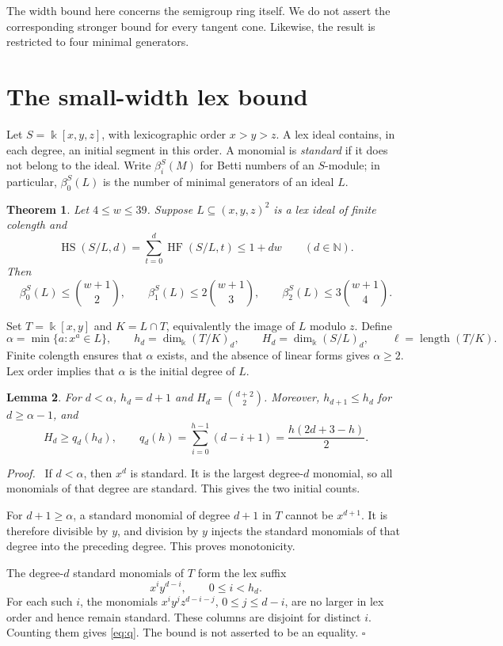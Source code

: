 \documentclass[11pt,a4paper]{article}
\newtheorem{theorem}{Theorem}[section]
\newtheorem{lemma}[theorem]{Lemma}
\newenvironment{proof}[1][Proof]{\par\noindent\textit{#1.}\ \ignorespaces}{\unskip\nobreak\hfill\ensuremath{\square}\par}
\newcommand{\NN}{\mathbb N}
\newcommand{\kk}{\Bbbk}
\newcommand{\HF}{\operatorname{HF}}
\newcommand{\HS}{\operatorname{HS}}
\newcommand{\len}{\operatorname{length}}
\begin{document}
The width bound here concerns the semigroup ring itself. We do not assert the corresponding stronger bound for every tangent cone. Likewise, the result is restricted to four minimal generators.

\section{The small-width lex bound}\label{sec:lex}
Let $S=\kk[x,y,z]$, with lexicographic order $x>y>z$. A lex ideal contains, in each degree, an initial segment in this order. A monomial is \emph{standard} if it does not belong to the ideal. Write $\beta_i^S(M)$ for Betti numbers of an $S$-module; in particular, $\beta_0^S(L)$ is the number of minimal generators of an ideal $L$.

\begin{theorem}\label{thm:lex}
Let $4\le w\le39$. Suppose $L\subseteq(x,y,z)^2$ is a lex ideal of finite colength and
\begin{equation}\label{eq:budget}
 \HS(S/L,d)=\sum_{t=0}^{d}\HF(S/L,t)\le1+dw\qquad(d\in\NN).
\end{equation}
Then
\[
 \beta_0^S(L)\le\binom{w+1}{2},\qquad
 \beta_1^S(L)\le2\binom{w+1}{3},\qquad
 \beta_2^S(L)\le3\binom{w+1}{4}.
\]
\end{theorem}

Set $T=\kk[x,y]$ and $K=L\cap T$, equivalently the image of $L$ modulo $z$. Define
\[
 \alpha=\min\{a:x^a\in L\},\qquad
 h_d=\dim_\kk(T/K)_d,\qquad H_d=\dim_\kk(S/L)_d,
 \qquad \ell=\len(T/K).
\]
Finite colength ensures that $\alpha$ exists, and the absence of linear forms gives $\alpha\ge2$. Lex order implies that $\alpha$ is the initial degree of $L$.

\begin{lemma}\label{lem:count}
For $d<\alpha$, $h_d=d+1$ and $H_d=\binom{d+2}{2}$. Moreover, $h_{d+1}\le h_d$ for $d\ge\alpha-1$, and
\begin{equation}\label{eq:q}
 H_d\ge q_d(h_d),\qquad
 q_d(h)=\sum_{i=0}^{h-1}(d-i+1)=\frac{h(2d+3-h)}2.
\end{equation}
\end{lemma}
\begin{proof}
If $d<\alpha$, then $x^d$ is standard. It is the largest degree-$d$ monomial, so all monomials of that degree are standard. This gives the two initial counts.

For $d+1\ge\alpha$, a standard monomial of degree $d+1$ in $T$ cannot be $x^{d+1}$. It is therefore divisible by $y$, and division by $y$ injects the standard monomials of that degree into the preceding degree. This proves monotonicity.

The degree-$d$ standard monomials of $T$ form the lex suffix
\[
 x^i y^{d-i},\qquad 0\le i<h_d.
\]
For each such $i$, the monomials $x^iy^jz^{d-i-j}$, $0\le j\le d-i$, are no larger in lex order and hence remain standard. These columns are disjoint for distinct $i$. Counting them gives \eqref{eq:q}. The bound is not asserted to be an equality.
\end{proof}
\end{document}
